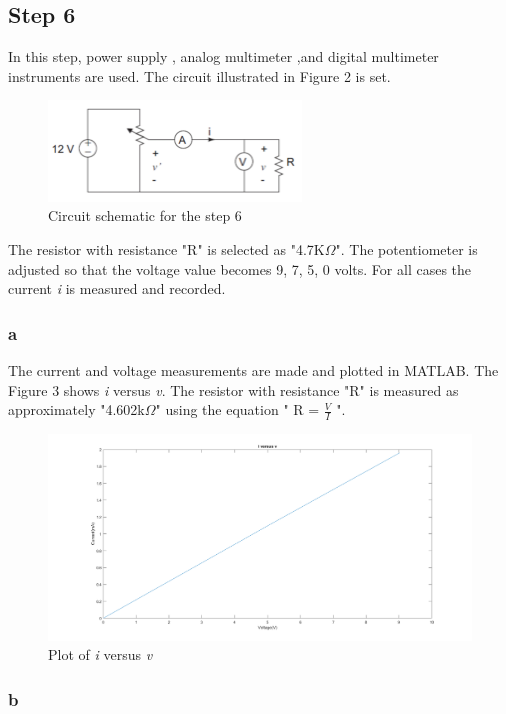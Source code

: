 \documentclass[letterpaper,12pt]{article}
\begin{document}
\subsection{Step 6}
In this step, power supply , analog multimeter ,and digital multimeter instruments are used. The circuit illustrated in Figure 2 is set. 

\begin{figure}[H]
	\caption{Circuit schematic for the step 6}
	\centering
	\includegraphics[width=0.6\textwidth]{6.png}
\end{figure} 

The resistor with resistance "R" is selected as "4.7K\(\Omega\)". The potentiometer is adjusted so that the voltage value becomes 9, 7, 5, 0 volts. For all cases the current \emph{i} is measured and recorded.

\subsubsection{a}
The current and voltage measurements are made and plotted in MATLAB. The Figure 3 shows  \emph{i} versus \emph{v}. The resistor with resistance "R" is measured as approximately "4.602k\(\Omega\)" using the equation " R  = \(\frac{V}{I}\) ".

\begin{figure}[H]
	\caption{Plot of \emph{i} versus \emph{v}}
	\centering
	\includegraphics[width=1\textwidth]{6a.png}
\end{figure} 


\subsubsection{b}
\end{document}
